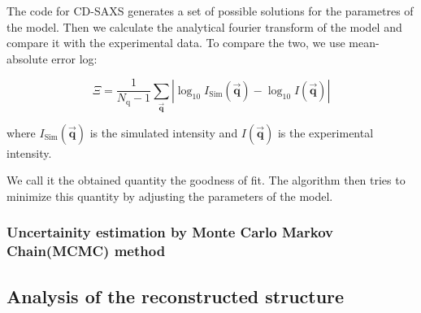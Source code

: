 The code for CD-SAXS generates a set of possible solutions for the parametres of the model. Then we calculate the 
analytical fourier transform of the model and compare it with the experimental data. To compare the two,
we use mean-absolute error log:

\begin{equation}
    \Xi=\frac{1}{N_{\mathrm{q}}-1} \sum_{\overrightarrow{\mathbf{q}}}\left|\log _{10} I_{\mathrm{Sim}}(\overrightarrow{\mathbf{q}})-\log _{10} I(\overrightarrow{\mathbf{q}})\right|
\end{equation}

where $I_{\mathrm{Sim}}(\overrightarrow{\mathbf{q}})$ is the simulated intensity and $I(\overrightarrow{\mathbf{q}})$ is the experimental intensity.

We call it the obtained quantity the goodness of fit. The algorithm then tries to minimize this quantity by adjusting the parameters of the model.

\subsubsection{Uncertainity estimation by Monte Carlo Markov Chain(MCMC) method}


\subsection{Analysis of the reconstructed structure}